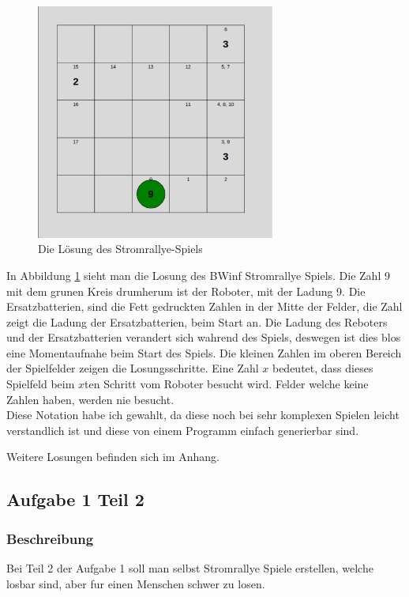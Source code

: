 \documentclass[a4paper,12pt,arial]{scrartcl}
\begin{document}
\begin{figure}[htbp]
    \centering
    \includegraphics[width=0.7\textwidth]{Solution.pdf}
    \caption{Die Lösung des Stromrallye-Spiels}
    \label{fig:loesung1}
\end{figure}
\newpage
In Abbildung \ref{fig:loesung1} sieht man die Losung des BWinf Stromrallye Spiels. Die Zahl 9 mit dem grunen Kreis drumherum ist der Roboter, mit der Ladung 9.
Die Ersatzbatterien, sind die Fett gedruckten Zahlen in der Mitte der Felder, die Zahl zeigt die Ladung der Ersatzbatterien, beim Start an.
Die Ladung des Reboters und der Ersatzbatterien verandert sich wahrend des Spiels, deswegen ist dies blos eine Momentaufnahe beim Start des Spiels.
Die kleinen Zahlen im oberen Bereich der Spielfelder zeigen die Losungsschritte.
Eine Zahl $x$ bedeutet, dass dieses Spielfeld beim $x$ten Schritt vom Roboter besucht wird.
Felder welche keine Zahlen haben, werden nie besucht.
\\
Diese Notation habe ich gewahlt, da diese noch bei sehr komplexen Spielen leicht verstandlich ist und diese von einem Programm einfach generierbar sind.
\par
Weitere Losungen befinden sich im Anhang.

\subsection{Aufgabe 1 Teil 2}
\subsubsection{Beschreibung}
Bei Teil 2 der Aufgabe 1 soll man selbst Stromrallye Spiele erstellen, welche losbar sind, aber fur einen Menschen schwer zu losen.
\end{document}
